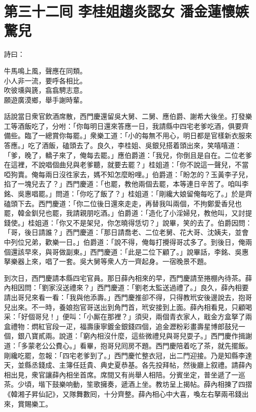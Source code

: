 
\chapter*{第三十二囘 李桂姐趨炎認女 潘金蓮懷嫉驚兒}


詩曰：

\begin{myquote}
牛馬鳴上風，聲應在同類。\\小人非一流，要呼各相比。\\吹彼壎與篪，翕翕騁志意。\\願遊廣漠鄉，舉手謝時輩。
\end{myquote}

話說當日衆官飲酒席散，西門慶還留吳大舅、二舅、應伯爵、謝希大後坐。打發樂工等酒飯吃了，分咐：「你每明日還來答應一日，我請縣中四宅老爹吃酒，俱要齊備些。臨了一總賞你每罷。」衆樂工道：「小的每無不用心，明日都是官樣新衣服來答應。」吃了酒飯，磕頭去了。良久，李桂姐、吳銀兒搭着頭出來，笑嘻嘻道：「爹，晚了，轎子來了，俺每去罷。」應伯爵道：「我兒，你倒且是自在。二位老爹在這裡，不說唱個曲兒與老爹聽，就要去罷？」桂姐道：「你不說這一聲兒，不當啞狗賣。俺每兩日沒徃家去，媽不知怎麼盼哩。」伯爵道：「盼怎的？玉黃李子兒，掐了一塊兒去了？」西門慶道：「也罷，教他兩個去罷，本等連日辛苦了。咱叫李銘、吳惠唱罷。」問道：「你吃了飯了？」桂姐道：「剛纔大娘留俺每吃了。」於是齊磕頭下去。西門慶道：「你二位後日還來走走，再替我叫兩個，不拘鄭愛香兒也罷，韓金釧兒也罷，我請親朋吃酒。」伯爵道：「造化了小淫婦兒，教他叫，又討提錢使。」桂姐道：「你又不是架兒，你怎曉得恁切？」說畢，笑的去了。伯爵因問：「哥，後日請誰？」西門慶道：「那日請喬老、二位老舅、花大哥、沈姨夫，並會中列位兄弟，歡樂一日。」伯爵道：「說不得，俺每打攪得哥忒多了。到後日，俺兩個還該早來，與哥做副東。」{}西門慶道：「此是二位下顧了。」說畢話，李銘、吳惠拏樂器上來，唱了一套。吳大舅等衆人方一齊起身。一宿晚景不題。

到次日，西門慶請本縣四宅官員。那日薛內相來的早，西門慶請至捲棚內待茶。薛內相因問：「劉家沒送禮來？」西門慶道：「劉老太監送過禮了。」良久，薛內相要請出哥兒來看一看：「我與他添壽。」西門慶推卻不得，只得教玳安後邊說去，抱哥兒出來。不一時，養娘抱官哥送出到角門首，玳安接到上面。薛內相看見，只顧喝采：「好個哥兒！」便叫：「小厮在那裡？」須臾，兩個青衣家人，戢金方盒拏了兩盒禮物：熌紅官段一疋，福壽康寧鍍金銀錢四個，追金瀝粉彩畫壽星博郎鼓兒一個，銀八寶貳兩。說道：「窮內相沒什麼，這些微禮兒與哥兒耍子。」西門慶作揖謝道：「多蒙老公公費心。」看畢，抱哥兒囘房不題。西門慶陪着吃了茶，就先擺飯。剛纔吃罷，忽報：「四宅老爹到了。」西門慶忙整衣冠，出二門迎接。乃是知縣李達天，並縣丞錢成、主簿任廷貴、典史夏恭基。各先投拜帖，然後廳上叙禮。請薛內相出見，衆官讓薛內相坐首席。席間又有尚舉人相陪。分賓坐定，普坐遞了一巡茶。少頃，堦下鼓樂响動，笙歌擁奏，遞酒上坐。教坊呈上揭帖。薛內相揀了四摺《韓湘子昇仙記》，又隊舞數囘，十分齊整。薛內相心中大喜，喚左右拏兩弔錢出來，賞賜樂工。


